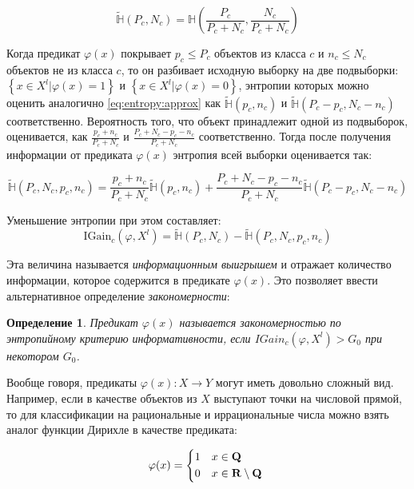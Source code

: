 \documentclass[12pt]{article}
\newtheorem{definition}{Определение}
\begin{document}
\begin{equation}\label{eq:entropy:approx}
\tilde{\mathbb{H}}(P_c, N_c) =
\mathbb{H}\left(\frac{P_c}{P_c+N_c},\frac{N_c}{P_c+N_c}\right)
\end{equation}

Когда предикат \(\varphi(x)\) покрывает \(p_c\leqslant P_c\) объектов из
класса \(c\) и \(n_c\leqslant N_c\) объектов не из класса \(c\), то он
разбивает исходную выборку на две подвыборки: \(\left\{x\in X^l |
\varphi(x) = 1\right\}\) и \(\left\{x\in X^l | \varphi(x) =
0\right\}\), энтропии которых можно оценить аналогично
\ref{eq:entropy:approx} как \(\tilde{\mathbb{H}}(p_c, n_c)\) и
\(\tilde{\mathbb{H}}(P_c - p_c, N_c - n_c)\)
соответственно. Вероятность того, что объект принадлежит одной из
подвыборок, оценивается, как \(\frac{p_c + n_c}{P_c + N_c}\) и
\(\frac{P_c + N_c - p_c - n_c}{P_c + N_c}\) соответственно. Тогда
после получения информации от предиката \(\varphi(x)\) энтропия всей
выборки оценивается так:

\[
\tilde{\mathbb{H}}(P_c, N_c, p_c, n_c) =
\frac{p_c + n_c}{P_c + N_c}\tilde{\mathbb{H}}(p_c, n_c) +
\frac{P_c+N_c-p_c-n_c}{P_c+N_c}\tilde{\mathbb{H}}(P_c - p_c, N_c - n_c)
\]

Уменьшение энтропии при этом составляет:
\[
\text{IGain}_c(\varphi, X^l) =
\tilde{\mathbb{H}}(P_c, N_c) - \tilde{\mathbb{H}}(P_c, N_c, p_c, n_c)
\]

Эта величина называется \emph{информационным выигрышем} и отражает
количество информации, которое содержится в предикате
\(\varphi(x)\). Это позволяет ввести альтернативное определение
\emph{закономерности}:

\begin{definition}
  Предикат \(\varphi(x)\) называется \emph{закономерностью} по
  энтропийному критерию информативности, если \(IGain_c (\varphi, X^l)
  > G_0\) при некотором \(G_0\).
\end{definition}

Вообще говоря, предикаты \(\varphi(x)\colon X \rightarrow Y\) могут
иметь довольно сложный вид. Например, если в качестве объектов из
\(X\) выступают точки на числовой прямой, то для классификации на
рациональные и иррациональные числа можно взять аналог функции Дирихле
в качестве предиката:

\[
\varphi(x) =
\begin{dcases*}
1 & \(x \in \mathbf{Q}\) \\
0 & \(x \in \mathbf{R} \setminus \mathbf{Q}\)
\end{dcases*}
\]
\end{document}
